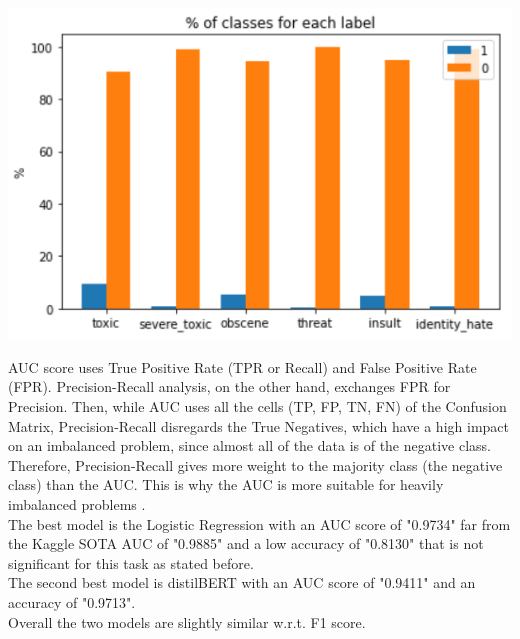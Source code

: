 \documentclass[10.5pt]{article}
\begin{document}
\begin{multicols*}{2}
\begin{center}
\includegraphics[scale=0.28]{avg_class_per_label.png}
\label{tab_avg_class}
\end{center}

AUC score uses True Positive Rate (TPR or Recall) and False Positive Rate (FPR). Precision-Recall analysis, on the other hand, exchanges FPR for Precision. Then, while AUC uses all the cells (TP, FP, TN, FN) of the Confusion Matrix, Precision-Recall disregards the True Negatives, which have a high impact on an imbalanced problem, since almost all of the data is of the negative class. Therefore, Precision-Recall gives more weight to the majority class (the negative class) than the AUC. This is why the AUC is more suitable for heavily imbalanced problems \cite{MetricsforImbalanced} \cite{ROCCurvesImbalancedClassification}.\\
The best model  is the Logistic Regression with an AUC score of "0.9734" far from the Kaggle SOTA AUC of "0.9885" and a low accuracy of "0.8130" that is not significant for this task as stated before.\\
The second best model is distilBERT with an AUC score of "0.9411" and an accuracy of "0.9713".\\
Overall the two models are slightly similar w.r.t. F1 score.

\end{multicols*}
\end{document}
